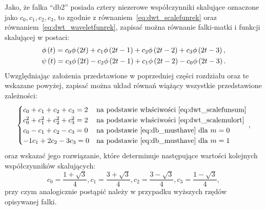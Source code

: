 Jako, że falka \enquote{db2} posiada cztery niezerowe współczynniki skalujące oznaczone jako $c_0, c_1, c_2, c_3$, to zgodnie z równaniem~\eqref{eq:dwt_scalefunrek} oraz równaniem~\eqref{eq:dwt_waveletfunrek}, zapisać można równanie falki-matki i funkcji skalującej w postaci:
\begin{gather}
\phi \left(t\right) = c_{0} \phi \left(2t\right) + c_{1} \phi \left( 2t - 1 \right) + c_{2} \phi \left( 2t - 2 \right) + c_{3} \phi \left( 2t - 3 \right) \label{eq:db2_scalefunrek}, \\
\psi \left(t\right) = c_{3} \phi \left(2t\right) - c_{2} \phi \left( 2t - 1 \right) + c_{1} \phi \left( 2t - 2 \right) - c_{0} \phi \left( 2t - 3 \right) \label{eq:db2_waveletfunrek}.
\end{gather}
Uwzględniając założenia przedstawione w poprzedniej części rozdziału oraz te wskazane powyżej, zapisać można układ równań wiążący wszystkie przedstawione zależności:
\begin{equation}
\begin{cases}
	c_{0} + c_{1} + c_{2} + c_{3} = 2                 & $na podstawie właściwości~\eqref{eq:dwt_scalefunsum}$ \\
	c_{0}^{2} + c_{1}^{2} + c_{2}^{2} + c_{3}^{2} = 2 & $na podstawie właściwości~\eqref{eq:dwt_scalemulort}$ \\
	c_{0} - c_{1} + c_{2} - c_{3} = 0                 & $na podstawie~\eqref{eq:db_musthave} dla $ m = 0 \\
	- 1 c_{1} + 2 c_{2} - 3 c_{3} = 0                 & $na podstawie~\eqref{eq:db_musthave} dla $ m = 1
\end{cases}
\label{eq:db2_system},
\end{equation}
oraz wskazać jego rozwiązanie, które determinuje następujące wartości kolejnych współczynników skalujących:
\begin{equation}
c_{0} = \frac{1 + \sqrt{3}}{4}, c_{1} = \frac{3 + \sqrt{3}}{4}, c_{2} = \frac{3 - \sqrt{3}}{4}, c_{3} = \frac{1 - \sqrt{3}}{4} \label{eq:db2_coefs},
\end{equation}
przy czym analogicznie postąpić należy w przypadku wyższych rzędów opisywanej falki.

